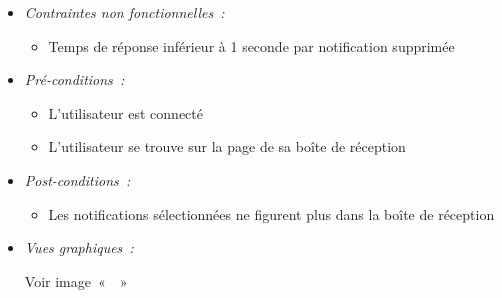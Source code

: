 \begin{itemize}
\item \textit{Contraintes non fonctionnelles~:}

    \begin{itemize}
        \item Temps de réponse inférieur à 1 seconde par notification supprimée
    \end{itemize}

\item \textit{Pré-conditions~:}

    \begin{itemize}
        \item L'utilisateur est connecté
        \item L'utilisateur se trouve sur la page de sa boîte de réception
    \end{itemize}

\item \textit{Post-conditions~:}

    \begin{itemize}
        \item Les notifications sélectionnées ne figurent plus dans la boîte de réception
    \end{itemize}
    
\item \textit{Vues graphiques~:}

Voir image~«~~»

\end{itemize}